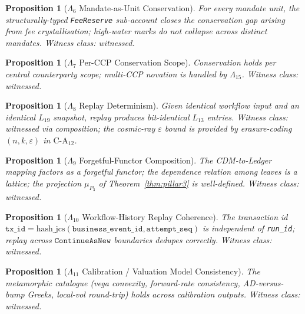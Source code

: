 \documentclass[11pt,a4paper]{article}
\newtheorem{proposition}[definition]{Proposition}
\begin{document}
\begin{proposition}[$\Lambda_6$ Mandate-as-Unit Conservation]
\label{prop:lambda6}
For every mandate unit, the structurally-typed \texttt{FeeReserve} sub-account closes the conservation gap arising from fee crystallisation; high-water marks do not collapse across distinct mandates. Witness class: \emph{witnessed}.
\end{proposition}

\begin{proposition}[$\Lambda_7$ Per-CCP Conservation Scope]
\label{prop:lambda7}
Conservation holds per central counterparty scope; multi-CCP novation is handled by $\Lambda_{15}$. Witness class: \emph{witnessed}.
\end{proposition}

\begin{proposition}[$\Lambda_8$ Replay Determinism]
\label{prop:lambda8}
Given identical workflow input and an identical $L_{19}$ snapshot, replay produces bit-identical $L_{13}$ entries. Witness class: \emph{witnessed via composition}; the cosmic-ray $\varepsilon$ bound is provided by erasure-coding $(n,k,\varepsilon)$ in $\mathrm{C\textrm{-}A}_{12}$.
\end{proposition}

\begin{proposition}[$\Lambda_9$ Forgetful-Functor Composition]
\label{prop:lambda9}
The CDM-to-Ledger mapping factors as a forgetful functor; the dependence relation among leaves is a lattice; the projection $\mu_{P_3}$ of Theorem~\ref{thm:pillar3} is well-defined. Witness class: \emph{witnessed}.
\end{proposition}

\begin{proposition}[$\Lambda_{10}$ Workflow-History Replay Coherence]
\label{prop:lambda10}
The transaction id $\texttt{tx\_id} = \mathrm{hash\_jcs}(\texttt{business\_event\_id}, \texttt{attempt\_seq})$ is independent of \texttt{run\_id}; replay across $\texttt{ContinueAsNew}$ boundaries dedupes correctly. Witness class: \emph{witnessed}.
\end{proposition}

\begin{proposition}[$\Lambda_{11}$ Calibration / Valuation Model Consistency]
\label{prop:lambda11}
The metamorphic catalogue (vega convexity, forward-rate consistency, AD-versus-bump Greeks, local-vol round-trip) holds across calibration outputs. Witness class: \emph{witnessed}.
\end{proposition}
\end{document}

